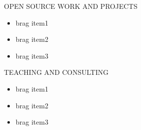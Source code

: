 \documentclass{./src/smartcv} %
\begin{document}
\begin{rSection}{OPEN SOURCE WORK AND PROJECTS}
\begin{itemize}
  \item brag item1
  \item brag item2
  \item brag item3
\end{itemize}

\end{rSection}

\begin{rSection}{TEACHING AND CONSULTING}
\begin{itemize}
  \item brag item1
  \item brag item2
  \item brag item3
\end{itemize}

\end{rSection}
\end{document}
